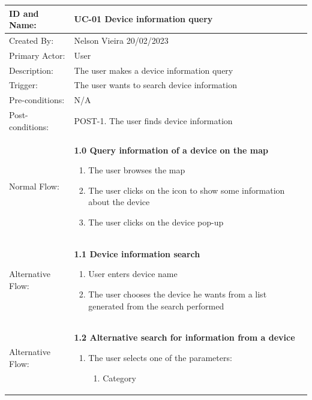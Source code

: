 \documentclass{scrreprt}
\begin{document}
\begin{table}[H]
    \centering
    \begin{adjustbox}{width=1.2\textwidth,center=\textwidth}
        \begin{tabular}{|m{4cm}|m{12cm}|}
            \hline
            ID and Name: & UC-01 Device information query \\
            \hline
            Created By: & Nelson Vieira 20/02/2023 \\
            \hline
            Primary Actor: & User \\
            \hline
            Description: & The user makes a device information query \\
            \hline
            Trigger: & The user wants to search device information \\
            \hline
            Pre-conditions: & N/A \\
            \hline
            Post-conditions: & POST-1. The user finds device information \\
            \hline
            Normal Flow: & \textbf{1.0 Query information of a device on the map}
            \begin{enumerate}
                \item The user browses the map
                \item The user clicks on the icon to show some information about the device
                \item The user clicks on the device pop-up
            \end{enumerate} \\
            \hline
            Alternative Flow: & \textbf{1.1 Device information search}
            \begin{enumerate}
                \item User enters device name
                \item The user chooses the device he wants from a list generated from the search performed
            \end{enumerate} \\
            \hline
            Alternative Flow: & \textbf{1.2 Alternative search for information from a device}
            \begin{enumerate}
                \item The user selects one of the parameters:
                \begin{enumerate}
                    \item Category

\end{enumerate}
\end{enumerate}
\end{tabular}
\end{adjustbox}
\end{table}
\end{document}
